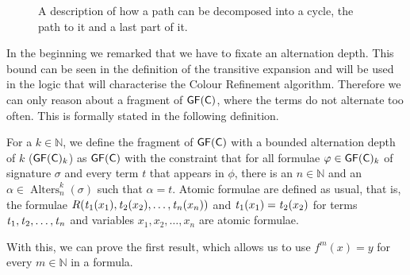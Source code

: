 \begin{figure}
	\centering
	
	\caption{A description of how a path can be decomposed into a cycle, the path to it and a last part of it.}
	\label{PathDecompositionPrinciple}
\end{figure}

In the beginning we remarked that we have to fixate an alternation depth.
This bound can be seen in the definition of the transitive expansion and will be used in the logic that will characterise the Colour Refinement algorithm.
Therefore we can only reason about a fragment of $\mathsf{GF}(\mathsf{C})$, where the terms do not alternate too often.
This is formally stated in the following definition.

\begin{definition}
	For a $k\in\mathbb N$, we define the fragment of $\mathsf{GF}(\mathsf{C})$ with a bounded alternation depth of $k$ ($\mathsf{GF}(\mathsf{C})_k$) as $\mathsf{GF}(\mathsf{C})$ with the constraint that for all formulae $\varphi\in\mathsf{GF}(\mathsf{C})_k$ of signature $\sigma$ and every term $t$ that appears in $\phi$, there is an $n\in \mathbb{N}$ and an $\alpha\in \operatorname{Alters}_n^k(\sigma)$ such that $\alpha=t$.
	Atomic formulae are defined as usual, that is, the formulae $R(\operatorname{\mathit{t}}_1(x_1),\operatorname{\mathit{t}}_2(x_2),\dots,\operatorname{\mathit{t}}_n(x_n))$ and $\operatorname{\mathit{t}}_1(x_1)=\operatorname{\mathit{t}}_2(x_2)$ for terms $\operatorname{\mathit{t}}_1,\operatorname{\mathit{t}}_2,\dots,\operatorname{\mathit{t}}_n$ and variables $x_1,x_2,\dots,x_n$ are atomic formulae.
\end{definition}

With this, we can prove the first result, which allows us to use $f^m(x)=y$ for every $m\in \mathbb N$ in a formula.

